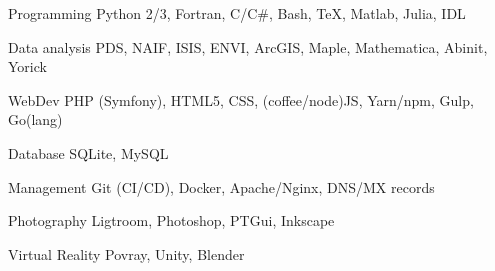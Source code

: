 
\begin{cvskills}

	\cvskill
	{Programming}
    {Python 2/3, Fortran, C/C\#, Bash, \TeX, Matlab, Julia, IDL}

	\cvskill
	{Data analysis}
    {PDS, NAIF, ISIS, ENVI, ArcGIS, Maple, Mathematica, Abinit, Yorick}

	\cvskill
    {WebDev}
    {PHP (Symfony), HTML5, CSS, (coffee/node)JS, Yarn/npm, Gulp, Go(lang)}

	\cvskill
    {Database}
    {SQLite, MySQL}

	\cvskill
    {Management}
    {Git (CI/CD), Docker, Apache/Nginx, DNS/MX records}

	\cvskill
    {Photography}
    {Ligtroom, Photoshop, PTGui, Inkscape}

    \cvskill
    {Virtual Reality}
    {Povray, Unity, Blender}

\end{cvskills}
